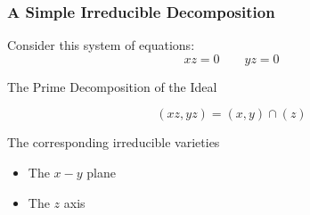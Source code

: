 \documentclass[11pt]{beamer}
\begin{document}
\begin{frame}
\frametitle{A Simple Irreducible Decomposition}

Consider this system of equations:
\[ xz = 0 \qquad yz = 0 \]

The Prime Decomposition of the Ideal

\[ (xz,yz) = (x,y) \cap (z) \]

The corresponding irreducible varieties

\begin{itemize}
\item The $x-y$ plane
\item The $z$ axis
\end{itemize}

\begin{center}

\end{center}
\end{frame}
\end{document}
